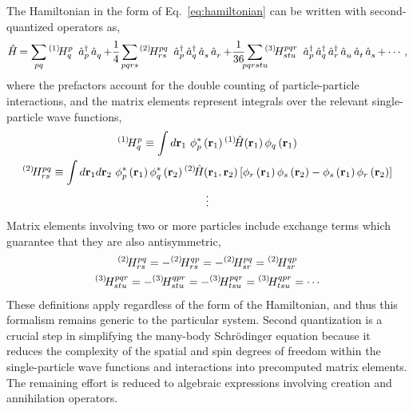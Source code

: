 \documentclass[thesis.tex]{subfiles}
\begin{document}
The Hamiltonian in the form of Eq.\ \eqref{eq:hamiltonian} can be written with second-quantized operators as,
\begin{equation}
  \Ham = \sum_{\mathclap{pq}}\Hint{1}{p}{q}\ \co{p}\ao{q} + \frac{1}{4}\sum_{\mathclap{pqrs}}\Hint{2}{pq}{rs}\ \co{p}\co{q}\ao{s}\ao{r} + \frac{1}{36}\sum_{\mathclap{pqrstu}}\Hint{3}{pqr}{stu}\ \co{p}\co{q}\co{r}\ao{u}\ao{t}\ao{s} + \cdots,
\end{equation}
where the prefactors account for the double counting of particle-particle interactions, and the matrix elements represent integrals over the relevant single-particle wave functions,
\begin{gather} \label{eq:braket_integration}
    {}^{\left(1\right)}\hspace{-2pt}H^{p}_{q} \equiv \int d\mathbf{r}_{1}\  \phi^{*}_{p}\left(\mathbf{r}_{1}\right) {}^{\left(1\right)}\hspace{-2pt}\hat{H}\hspace{-2pt}\left(\mathbf{r}_{1}\right) \phi_{q}\left(\mathbf{r}_{1}\right) \notag \\
    {}^{\left(2\right)}\hspace{-2pt}H^{pq}_{rs} \equiv \int d\mathbf{r}_{1} d\mathbf{r}_{2}\  \phi^{*}_{p}\left(\mathbf{r}_{1}\right)\phi^{*}_{q}\left(\mathbf{r}_{2}\right) {}^{\left(2\right)}\hspace{-2pt}\hat{H}\hspace{-2pt}\left(\mathbf{r}_{1},\mathbf{r}_{2}\right) \left[\phi_{r}\left(\mathbf{r}_{1}\right)\phi_{s}\left(\mathbf{r}_{2}\right) - \phi_{s}\left(\mathbf{r}_{1}\right)\phi_{r}\left(\mathbf{r}_{2}\right)\right] \notag \\
    \vdots
\end{gather}
Matrix elements involving two or more particles include exchange terms which guarantee that they are also antisymmetric,
\begin{gather} \label{eq:anti_sym_ME}
  {}^{\left(2\right)}\hspace{-2pt}H^{pq}_{rs} = -{}^{\left(2\right)}\hspace{-2pt}H^{qp}_{rs} = -{}^{\left(2\right)}\hspace{-2pt}H^{pq}_{sr} = {}^{\left(2\right)}\hspace{-2pt}H^{qp}_{sr} \notag \\
  {}^{\left(3\right)}\hspace{-2pt}H^{pqr}_{stu} = -{}^{\left(3\right)}\hspace{-2pt}H^{qpr}_{stu} = -{}^{\left(3\right)}\hspace{-2pt}H^{pqr}_{tsu} = {}^{\left(3\right)}\hspace{-2pt}H^{qpr}_{tsu} = \cdots
\end{gather}
These definitions apply regardless of the form of the Hamiltonian, and thus this formalism remains generic to the particular system.  Second quantization is a crucial step in simplifying the many-body Schr\"{o}dinger equation because it reduces the complexity of the spatial and spin degrees of freedom within the single-particle wave functions and interactions into precomputed matrix elements.  The remaining effort is reduced to algebraic expressions involving creation and annihilation operators.
\end{document}
